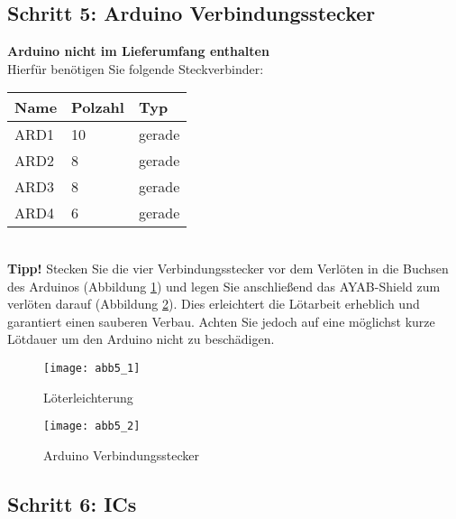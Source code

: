 \documentclass[fleqn,10pt]{SelfArx} %
\begin{document}
\FloatBarrier

 \subsection*{Schritt 5: Arduino Verbindungsstecker}

\textbf{Arduino nicht im Lieferumfang enthalten}\\

Hierfür benötigen Sie folgende Steckverbinder:\\

\begin{tabular}{lll}
\hline
\textbf{Name} & \textbf{Polzahl}  & \textbf{Typ} \\ \hline
ARD1          & 10                & gerade       \\ \hline
ARD2          & 8                 & gerade       \\ \hline
ARD3          & 8                 & gerade       \\ \hline
ARD4          & 6                 & gerade       \\ \hline
\end{tabular}\\


\textbf{Tipp!} Stecken Sie die vier Verbindungsstecker vor dem Verlöten in die Buchsen des Arduinos (Abbildung \ref{fig:abb5_1}) und legen Sie anschließend das AYAB-Shield zum verlöten darauf (Abbildung \ref{fig:abb5_2}). Dies erleichtert die Lötarbeit erheblich und garantiert einen sauberen Verbau. Achten Sie jedoch auf eine möglichst kurze Lötdauer um den Arduino nicht zu beschädigen.

\begin{figure}[tbhp]\centering
\texttt{[image: abb5\_1]}
\caption{Löterleichterung}
\label{fig:abb5_1}
\end{figure}

\begin{figure}[tbhp]\centering
\texttt{[image: abb5\_2]}
\caption{Arduino Verbindungsstecker}
\label{fig:abb5_2}
\end{figure}

\FloatBarrier

 \subsection*{Schritt 6: ICs}
\end{document}
